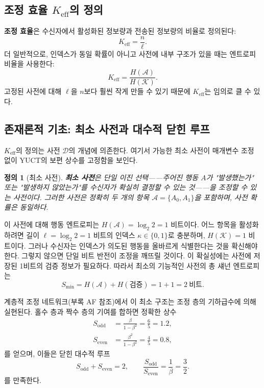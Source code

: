 \documentclass[12pt,a4paper]{article}
\newcommand{\Keff}{K_{\mathrm{eff}}}
\newtheorem{definition}[theorem]{정의}
\begin{document}
	\subsection{조정 효율 $\Keff$의 정의}
	\label{sec:keff-def}
	
	\textbf{조정 효율}은 수신자에서 활성화된 정보량과 전송된 정보량의 비율로 정의된다:
	\begin{equation}
		\Keff = \frac{n}{\ell}. \label{eq:keff-def}
	\end{equation}
	더 일반적으로, 인덱스가 동일 확률이 아니고 사전에 내부 구조가 있을 때는 엔트로피 비율을 사용한다:
	\begin{equation}
		\Keff = \frac{H(\mathcal{A})}{H(\mathcal{K})}.
	\end{equation}
	고정된 사전에 대해 $\ell$을 $n$보다 훨씬 작게 만들 수 있기 때문에 $\Keff$는 임의로 클 수 있다.
	
	\subsection{존재론적 기초: 최소 사전과 대수적 닫힌 루프}
	\label{subsec:minimal-dict}
	
	$\Keff$의 정의는 사전 $\mathcal{D}$의 개념에 의존한다. 여기서 가능한 최소 사전이 매개변수 조정 없이 YUCT의 보편 상수를 고정함을 보인다.
	
	\begin{definition}[최소 사전]
		\textbf{최소 사전}은 단일 이진 선택——주어진 행동 $A$가 "발생했는가" 또는 "발생하지 않았는가"를 수신자가 확실히 결정할 수 있는 것——을 조정할 수 있는 사전이다. 그러한 사전은 정확히 두 개의 항목 $\mathcal{A} = \{A_0, A_1\}$을 포함하며, 사전 확률은 동일하다.
	\end{definition}
	
	이 사전에 대해 행동 엔트로피는 $H(\mathcal{A}) = \log_2 2 = 1$ 비트이다. 어느 항목을 활성화하려면 길이 $\ell = \log_2 2 = 1$ 비트의 인덱스 $\kappa \in \{0,1\}$로 충분하며, $H(\mathcal{K}) = 1$ 비트이다. 그러나 수신자는 인덱스가 의도된 행동을 올바르게 식별한다는 것을 확신해야 한다. 그렇지 않으면 단일 비트 반전이 조정을 깨뜨릴 것이다. 이 확실성에는 사전에 저장된 1비트의 검증 정보가 필요하다. 따라서 최소의 기능적인 사전의 총 섀넌 엔트로피는
	\begin{equation}
		S_{\min} = H(\mathcal{A}) + H(\text{검증}) = 1 + 1 = 2\ \text{비트}.
		\label{eq:smin}
	\end{equation}
	
	계층적 조정 네트워크(부록 AF 참조)에서 이 최소 구조는 조정 층의 기하급수에 의해 실현된다. 홀수 층과 짝수 층의 기여를 합하면 정확한 상수
	\begin{align}
		S_{\mathrm{odd}} &= \frac{\beta}{1-\beta^{2}} = \frac{6}{5} = 1.2, \label{eq:sodd-appx}\\
		S_{\mathrm{even}} &= \frac{\beta^{2}}{1-\beta^{2}} = \frac{4}{5} = 0.8, \label{eq:seven-appx}
	\end{align}
	를 얻으며, 이들은 닫힌 대수적 루프
	\begin{equation}
		S_{\mathrm{odd}} + S_{\mathrm{even}} = 2, \qquad
		\frac{S_{\mathrm{odd}}}{S_{\mathrm{even}}} = \frac{1}{\beta} = \frac{3}{2}.
		\label{eq:algebraic-loop-appx}
	\end{equation}
	를 만족한다.
	
\end{document}
